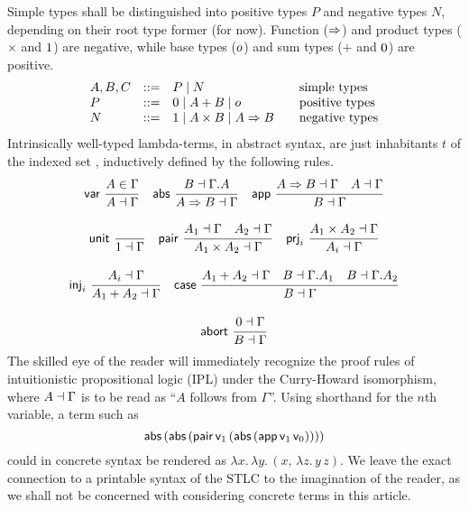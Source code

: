 \documentclass[sigplan,screen,fleqn]{acmart}
\begin{document}
Simple types shall be distinguished into positive types $P$ and
negative types $N$, depending on their root type former (for now).  Function
($\Rightarrow$) and product types ($\times$ and $1$) are negative,
while base types ($o$) and sum types ($+$ and $0$) are positive.
\[
\begin{array}{lrl@{\qquad}l}
  A,B,C & ::= & P \mid N & \mbox{simple types} \\
  P     & ::= & \tyzero \mid A + B \mid \tybase & \mbox{positive types} \\
  N     & ::= & \tyone \mid A \times B \mid A \To B
    & \mbox{negative types} \\
\end{array}
\]
Intrinsically well-typed lambda-terms, in abstract syntax,
are just inhabitants $t$ of the indexed set ,
inductively defined by the following rules.
\begin{gather*}
  \nru{\tvar}{A \in \Gamma}{A \from \Gamma}
\quad
  \nru{\tabs}{B \from \cext \Gamma A}{A \To B \from \Gamma}
\quad
  \nru{\tapp}
    {A \To B \from \Gamma \quad A \from \Gamma}
    {B \from \Gamma}
\\[2ex]
  \nru{\tunit}{}{\tyone \from \Gamma}
\quad
  \nru{\tpair}
    {A_1 \from \Gamma \quad A_2 \from \Gamma}
    {A_1 \times A_2 \from \Gamma}
\quad
  \nru{\tprj_i}
    {A_1 \times A_2 \from \Gamma}
    {A_i \from \Gamma}
\\[2ex]
  \nru{\tinj_i}
    {A_i \from \Gamma}
    {A_1 + A_2 \from \Gamma}
\quad
  \nru{\tcase}
    {A_1 + A_2 \from \Gamma
      \quad B \from \cext \Gamma A_1
      \quad B \from \cext \Gamma A_2
    }{B \from \Gamma}
\\[2ex]
  \nru{\tabort}
    {\tyzero \from \Gamma}
    {B \from \Gamma}
\end{gather*}
The skilled eye of the reader will immediately recognize the proof
rules of intuitionistic propositional logic (IPL) under the
Curry-Howard isomorphism, where $A \dashv \Gamma$ is to be read as
``$A$ follows from $\Gamma$''.  Using shorthand
 for the $n$th variable,
a term such as
\[
  \mathsf{abs}\,(\mathsf{abs}\,(\mathsf{pair}\,
    \mathsf{v}_{1}\,
    (\mathsf{abs}\,(\mathsf{app}\,\mathsf{v}_{1}\,\mathsf{v}_{0}))))
\]
could in concrete syntax be rendered as
\(
  \lambda x.\,\lambda y.\,(x,\,\lambda z.\,y\,z)
  .
\)
We leave the exact connection to a printable
syntax of the STLC to the imagination of the reader,
as we shall not be concerned with considering
concrete terms in this article.
\end{document}
